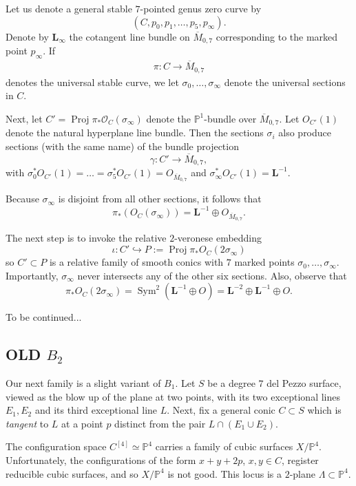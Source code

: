\documentclass[12 pt]{amsart}
\renewcommand{\P}{\mathbb{P}}
\newcommand{\<}{\left\langle}
\renewcommand{\>}{\right\rangle}
\DeclareMathOperator{\proj}{Proj}
\DeclareMathOperator{\sym}{Sym}
\newcommand{\M}{\overline{M}_{0,7}}
\begin{document}
Let us denote a general stable
$7$-pointed genus zero curve by
$$(C, p_{0}, p_{1}, \dots, p_{5}, p_{\infty}).$$  Denote
by $\mathbf{L}_{\infty}$ the cotangent line bundle on $\M$
corresponding to the marked point $p_{\infty}$. If
\begin{align}
  \label{eq:PM07}
  \pi: C \to \overline{M}_{0,7}
\end{align}
denotes the universal stable curve, we let
$\sigma_{0}, \dots, \sigma_{\infty}$ denote the universal sections in
$C$.

Next, let $C' = \proj \pi_{*}\mathcal{O}_{C}(\sigma_{\infty})$ denote
the $\P^{1}$-bundle over $\overline{M}_{0,7}$. Let $O_{C'}(1)$ denote
the natural hyperplane line bundle.  Then the sections $\sigma_{i}$
also produce sections (with the same name) of the bundle projection
$$\gamma : C' \to \M,$$ with
$\sigma_{0}^{*}O_{C'}(1) = \dots = \sigma_{5}^{*}O_{C'}(1) = O_{\M}$
and $\sigma_{\infty}^{*}O_{C'}(1) = \mathbf{L}^{-1}$.

Because $\sigma_{\infty}$ is disjoint from all other sections, it
follows that
$$\pi_{*}(O_{C}(\sigma_{\infty})) = \mathbf{L}^{-1} \oplus O_{\M}.$$


The next step is to invoke the relative $2$-veronese
embedding
$$\iota: C' \hookrightarrow P := \proj
\pi_{*}O_{C}(2\sigma_{\infty})$$ so $C' \subset P$ is a relative
family of smooth conics with $7$ marked points
$\sigma_{0}, \dots, \sigma_{\infty}$.  Importantly, $\sigma_{\infty}$
never intersects any of the other six sections.  Also, observe that
$$\pi_{*}O_{C}(2 \sigma_{\infty}) = \sym^{2}(\mathbf{L}^{-1} \oplus
O) = \mathbf{L}^{-2} \oplus \mathbf{L}^{-1} \oplus O.$$



To be continued...




\subsection{OLD $B_2$}


Our next family is a slight variant of $B_1$. Let $S$ be a degree $7$
del Pezzo surface, viewed as the blow up of the plane at two points,
with its two exceptional lines $E_1, E_2$ and its third exceptional
line $L$.  Next, fix a general conic $C \subset S$ which is {\sl
  tangent} to $L$ at a point $p$ distinct from the pair
$L \cap (E_1 \cup E_2)$.

The configuration space $C^{[4]} \simeq \P^{4}$ carries a family of
cubic surfaces $X/\P^{4}$.  Unfortunately, the configurations of the
form $x+y+2p$, $x,y \in C$, register reducible cubic surfaces, and so
$X/\P^{4}$ is not good.  This locus is a $2$-plane
$\Lambda \subset \P^{4}$.
\end{document}
